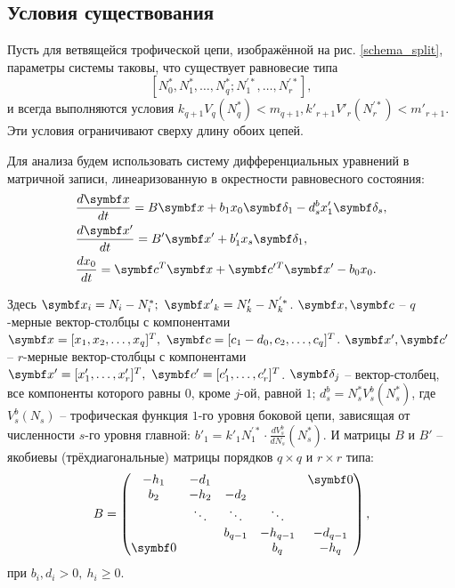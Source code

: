 \subsection{Условия существования}
Пусть для ветвящейся трофической цепи, изображённой на рис. \ref{schema_split}, параметры системы таковы, что существует равновесие типа 
\[ [ N^*_0, N^*_1, \dots, N^*_q; N^{'*}_1,\dots, N^{'*}_r ], \]
и всегда выполняются условия \( k_{q+1} V_q(N^{*}_q) < m_{q+1}, k'_{r+1} V'_r(N^{'*}_r) < m'_{r+1} \). Эти условия ограничивают сверху длину обоих цепей.

Для анализа будем использовать систему дифференциальных уравнений в матричной записи, линеаризованную в окрестности равновесного состояния:
\begin{equation} \label{double_matrix_system}
    \begin{split}
        & \frac{d \mb{x}}{dt} = B \mb{x} + b_1 x_0 \mb{\delta_1} - d^b_s x'_1 \mb{\delta_s}, \\
        & \frac{d \mb{x'}}{dt}= B' \mb{x'} + b'_1 x_s \mb{\delta_1}, \\
        & \frac{d x_0}{dt} = \mb{c}^T \mb{x} + \mb{c'}{}^T \mb{x'} - b_0 x_0.
    \end{split}
\end{equation}

Здесь \( \mb{x}_i = N_i - N^*_i; ~ \mb{x'}_k = N'_k - N^{'*}_k \). \( \mb{x}, \mb{c} \) -- \(q\)-мерные вектор-столбцы с компонентами \(\mb{x} = [x_1, x_2, \dots, x_q]^T, ~ \mb{c} = [c_1 - d_0, c_2, \dots, c_q]^T\). \( \mb{x'}, \mb{c'} \) -- \(r\)-мерные вектор-столбцы с компонентами \( \mb{x'} = [x'_1, \dots, x'_r]^T, ~ \mb{c'} = [c'_1, \dots, c'_r]^T \). \( \mb{\delta_j} \) -- вектор-столбец, все компоненты которого равны \(0\), кроме \(j\)-ой, равной \(1\); \(d^b_s = N^*_s V^b_s(N^*_s)\), где \( V^b_s(N_s) \) -- трофическая функция \(1\)-го уровня боковой цепи, зависящая от численности \(s\)-го уровня главной: \( b'_1 = k'_1 N^{'*}_1 \cdot \frac{d V^b_s}{d N_s} (N^{*}_s) \). И матрицы \(B\) и \(B'\) -- якобиевы (трёхдиагональные) матрицы порядков \(q \times q\) и \( r \times r \) типа:
\begin{equation*}
    B = \left( \begin{matrix}
        -h_1 & -d_1 &         &         & \mb{0}    \\
        b_2 & -h_2 & -d_2 \\
            & \ddots & \ddots & \ddots \\
            &        & b_{q-1} & -h_{q-1} & -d_{q-1} \\
        \mb{0}&      &         & b_q     & -h_q
    \end{matrix} \right),
\end{equation*}
при \(b_i, d_i > 0, ~ h_i \geq 0\).

